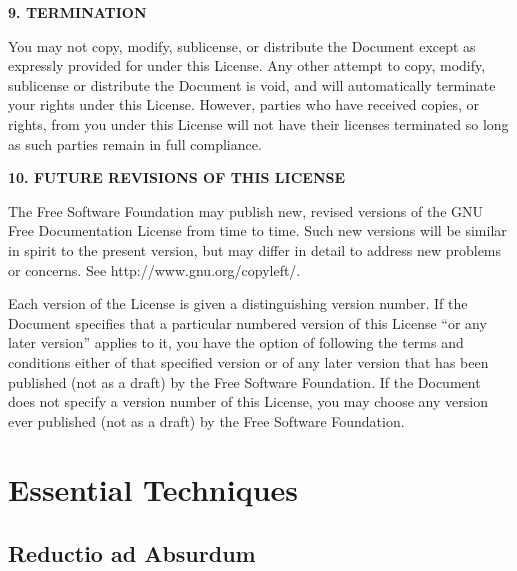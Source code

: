 \documentclass[11pt, openany]{book}
\theoremstyle{change} \theoremheaderfont{\blue\sffamily\bfseries}
\theoremstyle{nonumberplain} \theoremheaderfont{\sffamily\bfseries}
\newcommand{\í}{\'{\i}}
\begin{document}
{\begin{center}
{\Large\bf 9. TERMINATION\par} 
{}
\end{center}


You may not copy, modify, sublicense, or distribute the Document
except as expressly provided for under this License.  Any other
attempt to copy, modify, sublicense or distribute the Document is
void, and will automatically terminate your rights under this
License.  However, parties who have received copies, or rights, from
you under this License will not have their licenses terminated so
long as such parties remain in full compliance.


\begin{center}
{\Large\bf 10. FUTURE REVISIONS OF THIS LICENSE\par} 
{}
\end{center}


The Free Software Foundation may publish new, revised versions of
the GNU Free Documentation License from time to time.  Such new
versions will be similar in spirit to the present version, but may
differ in detail to address new problems or concerns.  See
http://www.gnu.org/copyleft/.

Each version of the License is given a distinguishing version
number. If the Document specifies that a particular numbered version
of this License ``or any later version'' applies to it, you have the
option of following the terms and conditions either of that
specified version or of any later version that has been published
(not as a draft) by the Free Software Foundation.  If the Document
does not specify a version number of this License, you may choose
any version ever published (not as a draft) by the Free Software
Foundation. }






 \clearpage




\renewcommand{\chaptermark}{\markboth{\chaptername\ \thechapter}}
\renewcommand{\sectionmark}{\markright}
\chapter{Essential
Techniques}\section{Reductio ad Absurdum}
\pagestyle{fancy} \setcounter{page}{1}
\end{document}

